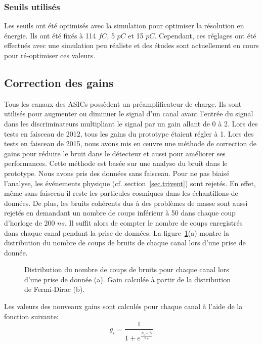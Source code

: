\subsubsection{Seuils utilisés}
Les seuils ont été optimisés avec la simulation pour optimiser la résolution en énergie. Ils ont été fixés à 114 $fC$, 5 $pC$ et 15 $pC$. Cependant, ces réglages ont été effectués avec une simulation peu réaliste et des études sont actuellement en cours pour ré-optimiser ces valeurs.

\subsection{Correction des gains}
\label{sec.gainCorrect}
Tous les canaux des ASICs possèdent un préamplificateur de charge. Ils sont utilisés pour augmenter ou diminuer le signal d'un canal avant l'entrée du signal dans les discriminateurs multipliant le signal par un gain allant de 0 à 2. Lors des tests en faisceau de 2012, tous les gains du prototype étaient régler à 1. Lors des tests en faisceau de 2015, nous avons mis en œuvre une méthode de correction de gains pour réduire le bruit dans le détecteur et aussi pour améliorer ses performances. Cette méthode est basée sur une analyse du bruit dans le prototype. Nous avons pris des données sans faisceau. Pour ne pas biaisé l'analyse, les événements physique (cf. section~\ref{sec.trivent}) sont rejetés. En effet, même sans faisceau il reste les particules cosmiques dans les échantillons de données. De plus, les bruits cohérents dus à des problèmes de masse sont aussi rejetés en demandant un nombre de coups inférieur à 50 dans chaque coup d'horloge de 200 $ns$. Il suffit alors de compter le nombre de coups enregistrés dans chaque canal pendant la prise de données. La figure~\ref{fig:noise_and_gain}(a) montre la distribution du nombre de coups de bruits de chaque canal lors d'une prise de donnée.
\begin{figure}[!ht]
  \caption{Distribution du nombre de coups de bruits pour chaque canal lors d'une prise de donnée (a). Gain calculée à partir de la distribution de Fermi-Dirac (b).\label{fig:noise_and_gain}}
\end{figure}
Les valeurs des nouveaux gains sont calculés pour chaque canal à l'aide de la fonction suivante:
\begin{equation}
  g_i=\frac{1}{1+e^{\frac{N_i-\tilde{N}}{\sigma_N}}}
\end{equation}
